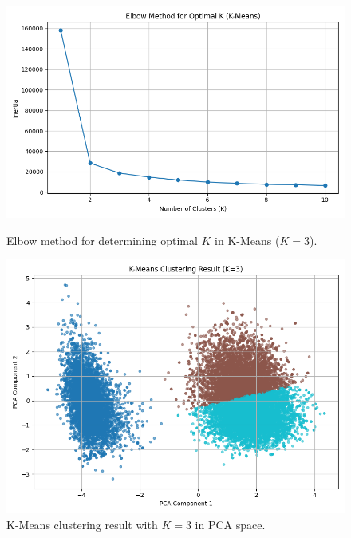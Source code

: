 \documentclass[12pt]{article}
\begin{document}
\begin{figure}[H]
    \centering
    \begin{minipage}[t]{0.48\textwidth}
        \includegraphics[width=\textwidth]{figures/kmeans_elbow.png}
        \caption{Elbow method for determining optimal $K$ in K-Means ($K=3$).}
        \label{C}
    \end{minipage}
    \hfill
    \begin{minipage}[t]{0.48\textwidth}
        \includegraphics[width=\textwidth]{figures/kmeans_clustered_pca_k3.png}
        \caption{K-Means clustering result with $K=3$ in PCA space.}
        \label{D}
    \end{minipage}
\end{figure}
\end{document}
